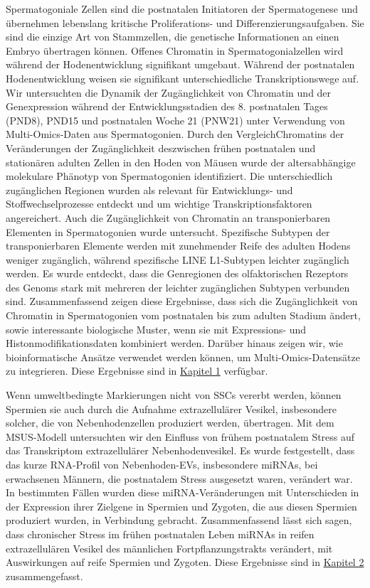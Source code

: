 \documentclass[12pt,twoside]{reedthesis}
\begin{document}
Spermatogoniale Zellen sind die postnatalen Initiatoren der Spermatogenese und übernehmen lebenslang kritische Proliferations- und Differenzierungsaufgaben. Sie sind die einzige Art von Stammzellen, die genetische Informationen an einen Embryo übertragen können. Offenes Chromatin in Spermatogonialzellen wird während der Hodenentwicklung signifikant umgebaut. Während der postnatalen Hodenentwicklung weisen sie signifikant unterschiedliche Transkriptionswege auf. Wir untersuchten die Dynamik der Zugänglichkeit von Chromatin und der Genexpression während der Entwicklungsstadien des 8. postnatalen Tages (PND8), PND15 und postnatalen Woche 21 (PNW21) unter Verwendung von Multi-Omics-Daten aus Spermatogonien. Durch den VergleichChromatins der Veränderungen der Zugänglichkeit deszwischen frühen postnatalen und stationären adulten Zellen in den Hoden von Mäusen wurde der altersabhängige molekulare Phänotyp von Spermatogonien identifiziert. Die unterschiedlich zugänglichen Regionen wurden als relevant für Entwicklungs- und Stoffwechselprozesse entdeckt und um wichtige Transkriptionsfaktoren angereichert. Auch die Zugänglichkeit von Chromatin an transponierbaren Elementen in Spermatogonien wurde untersucht. Spezifische Subtypen der transponierbaren Elemente werden mit zunehmender Reife des adulten Hodens weniger zugänglich, während spezifische LINE L1-Subtypen leichter zugänglich werden. Es wurde entdeckt, dass die Genregionen des olfaktorischen Rezeptors des Genoms stark mit mehreren der leichter zugänglichen Subtypen verbunden sind. Zusammenfassend zeigen diese Ergebnisse, dass sich die Zugänglichkeit von Chromatin in Spermatogonien vom postnatalen bis zum adulten Stadium ändert, sowie interessante biologische Muster, wenn sie mit Expressions- und Histonmodifikationsdaten kombiniert werden. Darüber hinaus zeigen wir, wie bioinformatische Ansätze verwendet werden können, um Multi-Omics-Datensätze zu integrieren. Diese Ergebnisse sind in \protect\hyperlink{chapter1}{Kapitel 1} verfügbar.

Wenn umweltbedingte Markierungen nicht von SSCs vererbt werden, können Spermien sie auch durch die Aufnahme extrazellulärer Vesikel, insbesondere solcher, die von Nebenhodenzellen produziert werden, übertragen. Mit dem MSUS-Modell untersuchten wir den Einfluss von frühem postnatalem Stress auf das Transkriptom extrazellulärer Nebenhodenvesikel. Es wurde festgestellt, dass das kurze RNA-Profil von Nebenhoden-EVs, insbesondere miRNAs, bei erwachsenen Männern, die postnatalem Stress ausgesetzt waren, verändert war. In bestimmten Fällen wurden diese miRNA-Veränderungen mit Unterschieden in der Expression ihrer Zielgene in Spermien und Zygoten, die aus diesen Spermien produziert wurden, in Verbindung gebracht. Zusammenfassend lässt sich sagen, dass chronischer Stress im frühen postnatalen Leben miRNAs in reifen extrazellulären Vesikel des männlichen Fortpflanzungstrakts verändert, mit Auswirkungen auf reife Spermien und Zygoten. Diese Ergebnisse sind in \protect\hyperlink{chapter2}{Kapitel 2} zusammengefasst.
\end{document}
